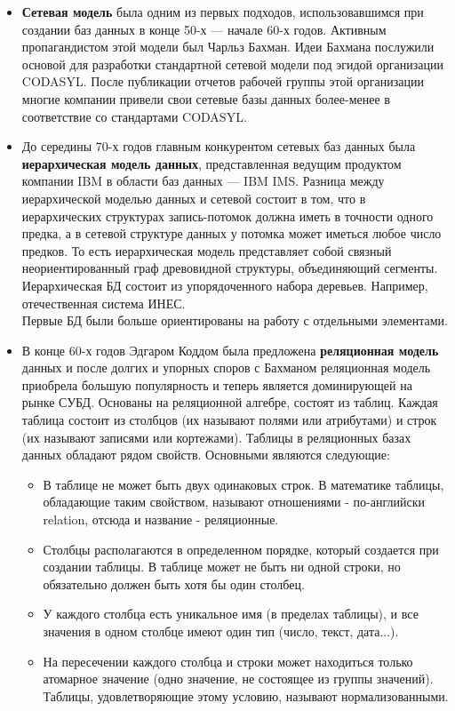\documentclass[12pt, a4paper]{article}
\begin{document}
\begin{itemize}
    \item \textbf{Сетевая модель} была одним из первых подходов, использовавшимся при создании баз данных в конце 50-х — начале 60-х годов. Активным пропагандистом этой модели был Чарльз Бахман. Идеи Бахмана послужили основой для разработки стандартной сетевой модели под эгидой организации CODASYL. После публикации отчетов рабочей группы этой организации многие компании привели свои сетевые базы данных более-менее в соответствие со стандартами CODASYL. 
    \item До середины 70-х годов главным конкурентом сетевых баз данных была \textbf{иерархическая модель данных}, представленная ведущим продуктом компании IBM в области баз данных — IBM IMS. Разница между иерархической моделью данных и сетевой состоит в том, что в иерархических структурах запись-потомок должна иметь в точности одного предка, а в сетевой структуре данных у потомка может иметься любое число предков. То есть иерархическая модель представляет собой связный неориентированный граф древовидной структуры, объединяющий сегменты. Иерархическая БД состоит из упорядоченного набора деревьев. Например, отечественная система ИНЕС.\\
    
    Первые БД были больше ориентированы на работу с отдельными элементами.
    
    \item В конце 60-х годов Эдгаром Коддом была предложена \textbf{реляционная модель} данных и после долгих и упорных споров с Бахманом реляционная модель приобрела большую популярность и теперь является доминирующей на рынке СУБД.
    Основаны на реляционной алгебре, состоят из таблиц. Каждая таблица состоит из столбцов (их называют полями или атрибутами) и строк (их называют записями или кортежами). Таблицы в реляционных базах данных обладают рядом свойств. Основными являются следующие:
    
    \begin{itemize}
        \item В таблице не может быть двух одинаковых строк. В математике таблицы, обладающие таким свойством, называют отношениями - по-английски relation, отсюда и название - реляционные.
        \item Столбцы располагаются в определенном порядке, который создается при создании таблицы. В таблице может не быть ни одной строки, но обязательно должен быть хотя бы один столбец.
        \item У каждого столбца есть уникальное имя (в пределах таблицы), и все значения в одном столбце имеют один тип (число, текст, дата...).
        \item На пересечении каждого столбца и строки может находиться только атомарное значение (одно значение, не состоящее из группы значений). Таблицы, удовлетворяющие этому условию, называют нормализованными.
    \end{itemize}
    

\end{itemize}
\end{document}
